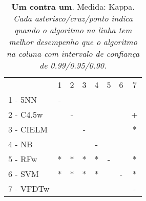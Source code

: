 \begin{table}[h]
\caption{\textbf{Um contra um}. Medida: Kappa. \textit{Cada asterisco/cruz/ponto indica quando o algoritmo na linha tem melhor desempenho que o algoritmo na coluna com intervalo de confiança de 0.99/0.95/0.90.}}
\begin{center}\begin{tabular}{lcc|cc|cc|c}
 			& 1 & 2 & 3 & 4 & 5 & 6 & 7\\
1 - 5NN  	& - &   &   &   &   &   &   \\
2 - C4.5w	&   & - &   &   &   &   & + \\ \hline
3 - CIELM	&   &   & - &   &   &   & * \\
4 - NB   	&   &   &   & - &   &   &   \\ \hline
5 - RFw  	& * & * & * & * & - &   & * \\
6 - SVM  	& * & * & * & * &   & - & * \\ \hline
7 - VFDTw	&   &   &   &   &   &   & - \\
\end{tabular}
\label{tab:friedClassif}
\end{center}
\end{table}